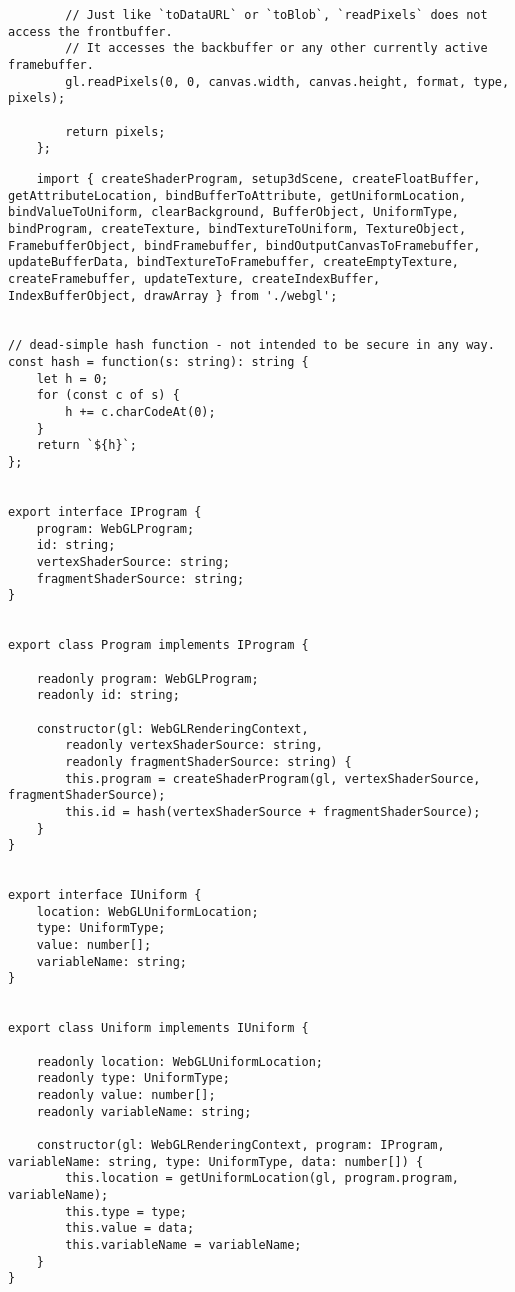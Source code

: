 {\begin{lstlisting}
        // Just like `toDataURL` or `toBlob`, `readPixels` does not access the frontbuffer.
        // It accesses the backbuffer or any other currently active framebuffer.
        gl.readPixels(0, 0, canvas.width, canvas.height, format, type, pixels);
    
        return pixels;
    };        
\end{lstlisting}

\begin{lstlisting}
    import { createShaderProgram, setup3dScene, createFloatBuffer, getAttributeLocation, bindBufferToAttribute, getUniformLocation, bindValueToUniform, clearBackground, BufferObject, UniformType, bindProgram, createTexture, bindTextureToUniform, TextureObject, FramebufferObject, bindFramebuffer, bindOutputCanvasToFramebuffer, updateBufferData, bindTextureToFramebuffer, createEmptyTexture, createFramebuffer, updateTexture, createIndexBuffer, IndexBufferObject, drawArray } from './webgl';


// dead-simple hash function - not intended to be secure in any way.
const hash = function(s: string): string {
    let h = 0;
    for (const c of s) {
        h += c.charCodeAt(0);
    }
    return `${h}`;
};


export interface IProgram {
    program: WebGLProgram;
    id: string;
    vertexShaderSource: string;
    fragmentShaderSource: string;
}


export class Program implements IProgram {

    readonly program: WebGLProgram;
    readonly id: string;

    constructor(gl: WebGLRenderingContext,
        readonly vertexShaderSource: string,
        readonly fragmentShaderSource: string) {
        this.program = createShaderProgram(gl, vertexShaderSource, fragmentShaderSource);
        this.id = hash(vertexShaderSource + fragmentShaderSource);
    }
}


export interface IUniform {
    location: WebGLUniformLocation;
    type: UniformType;
    value: number[];
    variableName: string;
}


export class Uniform implements IUniform {

    readonly location: WebGLUniformLocation;
    readonly type: UniformType;
    readonly value: number[];
    readonly variableName: string;

    constructor(gl: WebGLRenderingContext, program: IProgram, variableName: string, type: UniformType, data: number[]) {
        this.location = getUniformLocation(gl, program.program, variableName);
        this.type = type;
        this.value = data;
        this.variableName = variableName;
    }
}



\end{lstlisting}}

